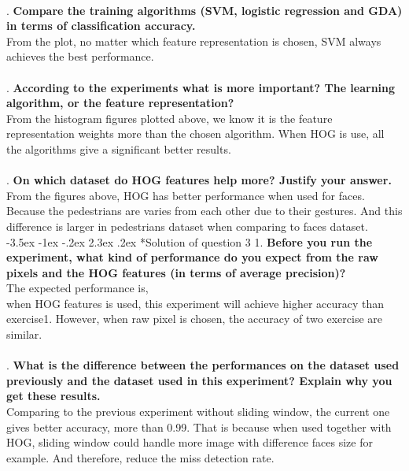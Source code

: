 \documentclass[12pt]{article}
\makeatletter
\renewcommand\section{\@startsection {section}{1}{\z@}%
	{-3.5ex \@plus -1ex \@minus -.2ex}%
	{2.3ex \@plus.2ex}%
	{\normalfont\large\bfseries}}%
\makeatother
\begin{document}
	\\
	. \textbf{Compare the training algorithms (SVM, logistic regression and GDA) in terms of classification accuracy.}\\
	From the plot, no matter which feature representation is chosen, SVM always achieves the best performance.\\
	\\
	. \textbf{According to the experiments what is more important? The learning algorithm, or the feature representation?}\\
	From the histogram figures plotted above, we know it is the feature representation weights more than the chosen algorithm. When HOG is use, all the algorithms give a significant better results.\\ 
	\\
	. \textbf{On which dataset do HOG features help more? Justify your answer.}\\
	From the figures above, HOG has better performance when used for faces.\\
	Because the pedestrians are varies from each other due to their gestures. And this difference is larger in pedestrians dataset when comparing to faces dataset.\\

	\section*{Solution of question 3}
	1. \textbf{Before you run the experiment, what kind of performance do you expect from the raw pixels and the HOG features (in terms of average precision)?}\\
	The expected performance is, \\
	when HOG features is used, this experiment will achieve higher accuracy than exercise1. However, when raw pixel is chosen, the accuracy of two exercise are similar.\\
	\\
	. \textbf{What is the difference between the performances on the dataset used previously and the dataset used in this experiment? Explain why you get these results.}\\
	Comparing to the previous experiment without sliding window, the current one gives better accuracy, more than 0.99. That is because when used together with HOG, sliding window could handle more image with difference faces size for example. And therefore, reduce the miss detection rate.\\
	
\end{document}
